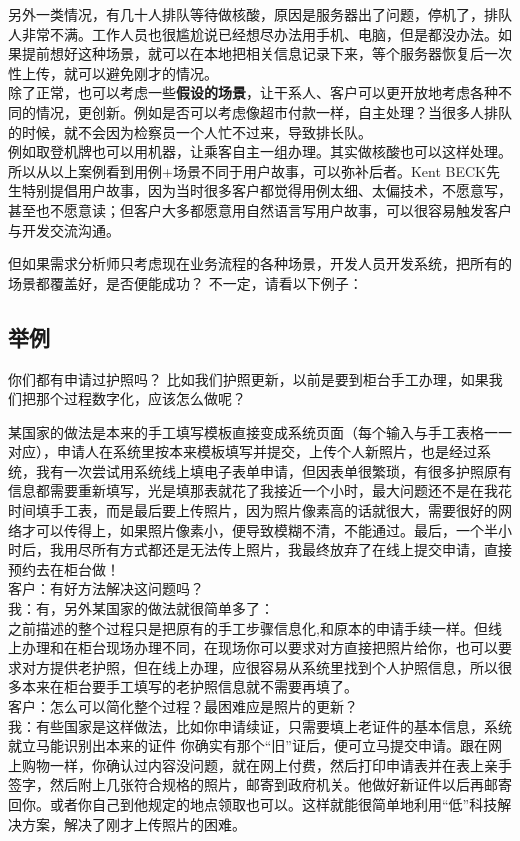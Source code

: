 另外一类情况，有几十人排队等待做核酸，原因是服务器出了问题，停机了，排队人非常不满。工作人员也很尴尬说已经想尽办法用手机、电脑，但是都没办法。如果提前想好这种场景，就可以在本地把相关信息记录下来，等个服务器恢复后一次性上传，就可以避免刚才的情况。\\
除了正常，也可以考虑一些\textbf{假设的场景}，让干系人、客户可以更开放地考虑各种不同的情况，更创新。例如是否可以考虑像超市付款一样，自主处理？当很多人排队的时候，就不会因为检察员一个人忙不过来，导致排长队。\\
例如取登机牌也可以用机器，让乘客自主一组办理。其实做核酸也可以这样处理。\\
所以从以上案例看到用例+场景不同于用户故事，可以弥补后者。Kent
BECK先生特别提倡用户故事，因为当时很多客户都觉得用例太细、太偏技术，不愿意写，甚至也不愿意读；但客户大多都愿意用自然语言写用户故事，可以很容易触发客户与开发交流沟通。

但如果需求分析师只考虑现在业务流程的各种场景，开发人员开发系统，把所有的场景都覆盖好，是否便能成功？
不一定，请看以下例子：

\hypertarget{ux4e3eux4f8b}{%
\subsection{举例}\label{ux4e3eux4f8b}}

你们都有申请过护照吗？
比如我们护照更新，以前是要到柜台手工办理，如果我们把那个过程数字化，应该怎么做呢？

某国家的做法是本来的手工填写模板直接变成系统页面（每个输入与手工表格一一对应），申请人在系统里按本来模板填写并提交，上传个人新照片，也是经过系统，我有一次尝试用系统线上填电子表单申请，但因表单很繁琐，有很多护照原有信息都需要重新填写，光是填那表就花了我接近一个小时，最大问题还不是在我花时间填手工表，而是最后要上传照片，因为照片像素高的话就很大，需要很好的网络才可以传得上，如果照片像素小，便导致模糊不清，不能通过。最后，一个半小时后，我用尽所有方式都还是无法传上照片，我最终放弃了在线上提交申请，直接预约去在柜台做！\\
客户：有好方法解决这问题吗？\\
我：有，另外某国家的做法就很简单多了：\\
之前描述的整个过程只是把原有的手工步骤信息化,和原本的申请手续一样。但线上办理和在柜台现场办理不同，在现场你可以要求对方直接把照片给你，也可以要求对方提供老护照，但在线上办理，应很容易从系统里找到个人护照信息，所以很多本来在柜台要手工填写的老护照信息就不需要再填了。\\
客户：怎么可以简化整个过程？最困难应是照片的更新？\\
我：有些国家是这样做法，比如你申请续证，只需要填上老证件的基本信息，系统就立马能识别出本来的证件
你确实有那个``旧''证后，便可立马提交申请。跟在网上购物一样，你确认过内容没问题，就在网上付费，然后打印申请表并在表上亲手签字，然后附上几张符合规格的照片，邮寄到政府机关。他做好新证件以后再邮寄回你。或者你自己到他规定的地点领取也可以。这样就能很简单地利用``低''科技解决方案，解决了刚才上传照片的困难。


